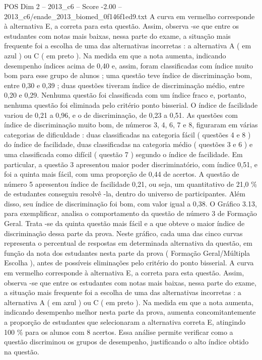 \begin{textsample}{POS Dim 2 – 2013\_c6 – Score -2.00 – 2013\_c6/enade\_2013\_biomed\_0f146f1ed9.txt}
A curva em vermelho corresponde à alternativa E, a correta para esta questão.
Assim, observa -se que entre os estudantes com notas mais baixas, nessa parte do exame, a situação mais frequente foi a escolha de uma das alternativas incorretas : a alternativa A ( em azul ) ou C ( em preto ).
Na medida em que a nota aumenta, indicando desempenho índices acima de 0,40 e, assim, foram classificadas com índice muito bom para esse grupo de alunos ; uma questão teve índice de discriminação bom, entre 0,30 e 0,39 ; duas questões tiveram índice de discriminação médio, entre 0,20 e 0,29.
Nenhuma questão foi classificada com um índice fraco e, portanto, nenhuma questão foi eliminada pelo critério ponto bisserial.
O índice de facilidade variou de 0,21 a 0,96, e o de discriminação, de 0,23 a 0,51.
As questões com índice de discriminação muito bom, de números 3, 4, 6, 7 e 8, figuraram em várias categorias de dificuldade : duas classificadas na categoria fácil ( questões 4 e 8 ) do índice de facilidade, duas classificadas na categoria médio ( questões 3 e 6 ) e uma classificada como difícil ( questão 7 ) segundo o índice de facilidade.
Em particular, a questão 3 apresentou maior poder discriminatório, com índice 0,51, e foi a quinta mais fácil, com uma proporção de 0,44 de acertos.
A questão de número 5 apresentou índice de facilidade 0,21, ou seja, um quantitativo de 21,0 \% de estudantes conseguiu resolvê -la, dentro do universo de participantes.
Além disso, seu índice de discriminação foi bom, com valor igual a 0,38.
O Gráfico 3.13, para exemplificar, analisa o comportamento da questão de número 3 de Formação Geral.
Trata -se da quinta questão mais fácil e a que obteve o maior índice de discriminação dessa parte da prova.
Neste gráfico, cada uma das cinco curvas representa o percentual de respostas em determinada alternativa da questão, em função da nota dos estudantes nesta parte da prova ( Formação Geral/Múltipla Escolha ), antes de possíveis eliminações pelo critério do ponto bisserial.
A curva em vermelho corresponde à alternativa E, a correta para esta questão.
Assim, observa -se que entre os estudantes com notas mais baixas, nessa parte do exame, a situação mais frequente foi a escolha de uma das alternativas incorretas : a alternativa A ( em azul ) ou C ( em preto ).
Na medida em que a nota aumenta, indicando desempenho melhor nesta parte da prova, aumenta concomitantemente a proporção de estudantes que selecionaram a alternativa correta E, atingindo 100 \% para os alunos com 8 acertos.
Essa análise permite verificar como a questão discriminou os grupos de desempenho, justificando o alto índice obtido na questão.

\end{textsample}
